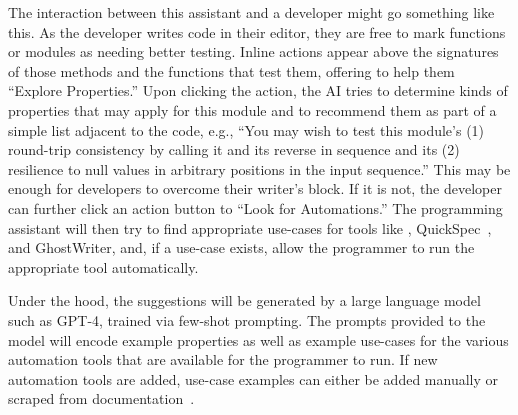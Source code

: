 The interaction between this assistant and a developer might go
something like this. As the
developer writes code in their editor, they are free to mark functions or
modules as needing better testing.
Inline actions appear
above the signatures of those methods and the
functions that test them, offering to help them ``Explore Properties.''
Upon clicking the action, the AI tries to determine
kinds of properties that may apply for this module
and to recommend them as part of a simple list adjacent to the
code, e.g., ``You may wish to test this module's (1) round-trip consistency by
calling it and its reverse in sequence and its (2) resilience to null values in
arbitrary positions in the input sequence.'' This may be enough for developers
to overcome their writer's block. If it is not, the developer can further click
an action button to ``Look for Automations.'' The programming assistant will
then try to find appropriate use-cases for tools like {\Mica},
QuickSpec~\cite{ref:claessen2010quickspec}, and GhostWriter, and, if a use-case
exists, allow the programmer to run the appropriate tool automatically.

Under the hood, the suggestions will be generated by a large language model
such as GPT-4, trained via few-shot prompting. The prompts provided to the model
will encode example properties as well as example use-cases for the various
automation tools that are available for the programmer to run. If new automation
tools are added, use-case examples can either be added manually or scraped from
documentation~\cite{zhu2023kani}.


